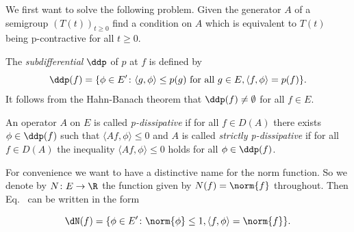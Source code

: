 We first want to solve the following problem.
Given the generator $A$ of a semigroup $(T(t))_{t\geq 0}$ find a condition on $A$ which is equivalent to $T(t)$ being p-contractive for all $t \geq 0$.

The \emph{subdifferential} $\ddp$ of\/ $p$ at $f$ is defined by
\begin{equation}\label{eq:a2-2.5}
\ddp(f) = \{\phi \in E' \colon \langle g,\phi \rangle \leq p(g) \text{ for all } g \in E, \langle f,\phi \rangle = p(f) \}.
\end{equation}
It follows from the Hahn-Banach theorem that $\ddp(f) \neq \emptyset$ for all $f \in E$.

\begin{definition}\label{def:a2-2.1}
An operator $A$ on $E$ is called \emph{p-dissipative} if for all $f \in D(A)$ there exists $\phi \in \ddp(f)$ such that $\langle Af,\phi \rangle \leq 0$ 
and $A$ is called \emph{strictly p-dissipative} if for all $f \in D(A)$ the inequality $\langle Af,\phi \rangle \leq 0$ holds for all $\phi \in \ddp(f)$.
\end{definition}
For convenience we want to have a distinctive name for the norm function.
So we denote by $N \colon E \to \R$ the function given by $N(f) = \norm{f}$ throughout.
Then Eq.~   can be written in the form

\begin{equation}\label{eq:a2-2.6}
\dN(f) = \{\phi \in E' \colon \norm{\phi}\leq 1, \langle f,\phi \rangle = \norm{f}\}.
\end{equation}


